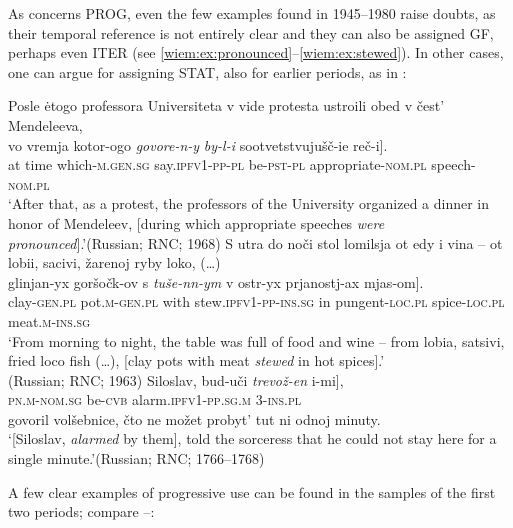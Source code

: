 \documentclass[output=paper]{langscibook}
\begin{document}
As concerns PROG, even the few examples found in 1945--1980 raise doubts, as their temporal reference is not entirely clear and they can also be assigned GF, perhaps even ITER (see \ref{wiem:ex:pronounced}--\ref{wiem:ex:stewed}). In other cases, one can argue for assigning STAT, also for earlier periods, as in :

\ea\label{wiem:ex:pronounced}{{Posle ėtogo professora Universiteta v vide protesta ustroili obed v čest’ Mendeleeva,}\\
\gll \minsp{[} vo vremja {kotor-ogo} {\textit{govore-n-y}} {\textit{by-l-i}} {sootvetstvujušč-ie} {reč-i}].\\
{} at time which-\textsc{m.gen.sg} say.\textsc{ipfv1-pp-pl} be-\textsc{pst-pl} appropriate-\textsc{nom.pl} speech-\textsc{nom.pl}\\
\glt ‘After that, as a protest, the professors of the University organized a dinner in honor of Mendeleev, [during which appropriate speeches \textit{were pronounced}].’\hfill (Russian; RNC; 1968)
}
\ex\label{wiem:ex:stewed}{{S utra do noči stol lomilsja ot edy i vina -- ot lobii, sacivi, žarenoj ryby loko, (\dots)} \\
\gll \minsp{[} {glinjan-yx} {goršočk-ov} {s} {\textit{tuše-nn-ym}} {v} {ostr-yx} {prjanostj-ax} {mjas-om}].\\
{} clay-\textsc{gen.pl} pot.\textsc{m}-\textsc{gen.pl} with stew.\textsc{ipfv1-pp-ins.sg} in pungent-\textsc{loc.pl} spice-\textsc{loc.pl} meat.\textsc{m-ins.sg}\\
\glt ‘From morning to night, the table was full of food and wine -- from lobia, satsivi, fried loco fish (…), [clay pots with meat \textit{stewed} in hot spices].’ \\
\hfill (Russian; RNC; 1963)
}
\ex\label{wiem:ex:alarmed}{\gll
\minsp{[} {Siloslav}, {bud-uči} {\textit{trevož-en}} {i-mi}],\\
{} \textsc{pn.m-nom.sg} be-\textsc{cvb} alarm.\textsc{ipfv1-pp.sg.m} \textsc{3-ins.pl}\\ 
{govoril volšebnice, čto ne možet probyt’ tut ni odnoj minuty.}\\
\glt ‘[Siloslav, \textit{alarmed} by them], told the sorceress that he could not stay here for a single minute.’\hfill (Russian; RNC; 1766--1768)
}
\z

\noindent A few clear examples of progressive use can be found in the samples of the first two periods; compare --:
\end{document}
